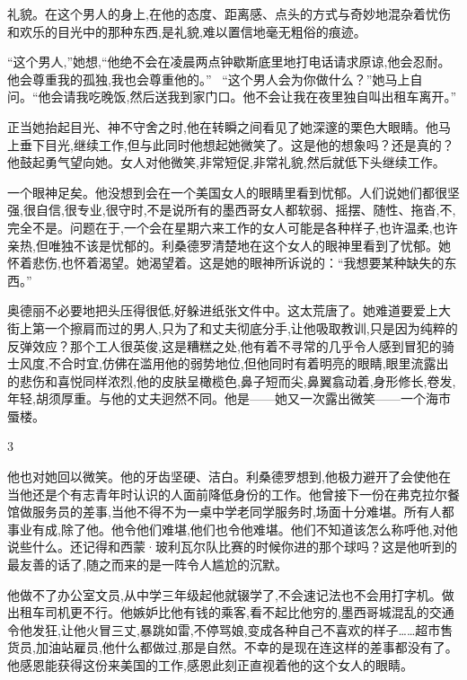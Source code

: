 \documentclass{ctexart}
\renewcommand{\\}{\par}
\begin{document}
礼貌。在这个男人的身上,在他的态度、距离感、点头的方式与奇妙地混杂着忧伤和欢乐的目光中的那种东西,是礼貌,难以置信地毫无粗俗的痕迹。 \\“这个男人,”她想,“他绝不会在凌晨两点钟歇斯底里地打电话请求原谅,他会忍耐。他会尊重我的孤独,我也会尊重他的。” \ “这个男人会为你做什么？”她马上自问。“他会请我吃晚饭,然后送我到家门口。他不会让我在夜里独自叫出租车离开。” \\正当她抬起目光、神不守舍之时,他在转瞬之间看见了她深邃的栗色大眼睛。他马上垂下目光,继续工作,但与此同时他想起她微笑了。这是他的想象吗？还是真的？他鼓起勇气望向她。女人对他微笑,非常短促,非常礼貌,然后就低下头继续工作。\\一个眼神足矣。他没想到会在一个美国女人的眼睛里看到忧郁。人们说她们都很坚强,很自信,很专业,很守时,不是说所有的墨西哥女人都软弱、摇摆、随性、拖沓,不,完全不是。问题在于,一个会在星期六来工作的女人可能是各种样子,也许温柔,也许亲热,但唯独不该是忧郁的。利桑德罗清楚地在这个女人的眼神里看到了忧郁。她怀着悲伤,也怀着渴望。她渴望着。这是她的眼神所诉说的：“我想要某种缺失的东西。” \\奥德丽不必要地把头压得很低,好躲进纸张文件中。这太荒唐了。她难道要爱上大街上第一个擦肩而过的男人,只为了和丈夫彻底分手,让他吸取教训,只是因为纯粹的反弹效应？那个工人很英俊,这是糟糕之处,他有着不寻常的几乎令人感到冒犯的骑士风度,不合时宜,仿佛在滥用他的弱势地位,但他同时有着明亮的眼睛,眼里流露出的悲伤和喜悦同样浓烈,他的皮肤呈橄榄色,鼻子短而尖,鼻翼翕动着,身形修长,卷发,年轻,胡须厚重。与他的丈夫迥然不同。他是——她又一次露出微笑——一个海市蜃楼。 \\ \begin{center} 3 \end{center} \\他也对她回以微笑。他的牙齿坚硬、洁白。利桑德罗想到,他极力避开了会使他在当他还是个有志青年时认识的人面前降低身份的工作。他曾接下一份在弗克拉尔餐馆做服务员的差事,当他不得不为一桌中学老同学服务时,场面十分难堪。所有人都事业有成,除了他。他令他们难堪,他们也令他难堪。他们不知道该怎么称呼他,对他说些什么。还记得和西蒙·玻利瓦尔队比赛的时候你进的那个球吗？这是他听到的最友善的话了,随之而来的是一阵令人尴尬的沉默。 \\他做不了办公室文员,从中学三年级起他就辍学了,不会速记法也不会用打字机。做出租车司机更不行。他嫉妒比他有钱的乘客,看不起比他穷的,墨西哥城混乱的交通令他发狂,让他火冒三丈,暴跳如雷,不停骂娘,变成各种自己不喜欢的样子……超市售货员,加油站雇员,他什么都做过,那是自然。不幸的是现在连这样的差事都没有了。他感恩能获得这份来美国的工作,感恩此刻正直视着他的这个女人的眼睛。 
\end{document}
